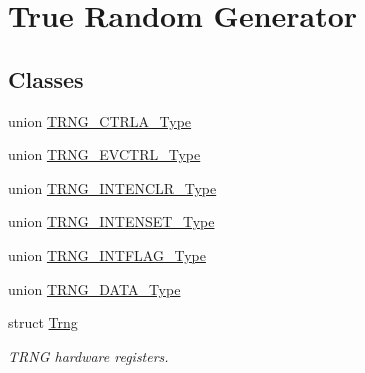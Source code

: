 \hypertarget{group___s_a_m_l21___t_r_n_g}{}\section{True Random Generator}
\label{group___s_a_m_l21___t_r_n_g}
\subsection*{Classes}
\begin{DoxyCompactItemize}
\item 
union \hyperlink{union_t_r_n_g___c_t_r_l_a___type}{T\+R\+N\+G\+\_\+\+C\+T\+R\+L\+A\+\_\+\+Type}
\item 
union \hyperlink{union_t_r_n_g___e_v_c_t_r_l___type}{T\+R\+N\+G\+\_\+\+E\+V\+C\+T\+R\+L\+\_\+\+Type}
\item 
union \hyperlink{union_t_r_n_g___i_n_t_e_n_c_l_r___type}{T\+R\+N\+G\+\_\+\+I\+N\+T\+E\+N\+C\+L\+R\+\_\+\+Type}
\item 
union \hyperlink{union_t_r_n_g___i_n_t_e_n_s_e_t___type}{T\+R\+N\+G\+\_\+\+I\+N\+T\+E\+N\+S\+E\+T\+\_\+\+Type}
\item 
union \hyperlink{union_t_r_n_g___i_n_t_f_l_a_g___type}{T\+R\+N\+G\+\_\+\+I\+N\+T\+F\+L\+A\+G\+\_\+\+Type}
\item 
union \hyperlink{union_t_r_n_g___d_a_t_a___type}{T\+R\+N\+G\+\_\+\+D\+A\+T\+A\+\_\+\+Type}
\item 
struct \hyperlink{struct_trng}{Trng}
\begin{DoxyCompactList}\small\item\em T\+R\+N\+G hardware registers. \end{DoxyCompactList}\end{DoxyCompactItemize}
